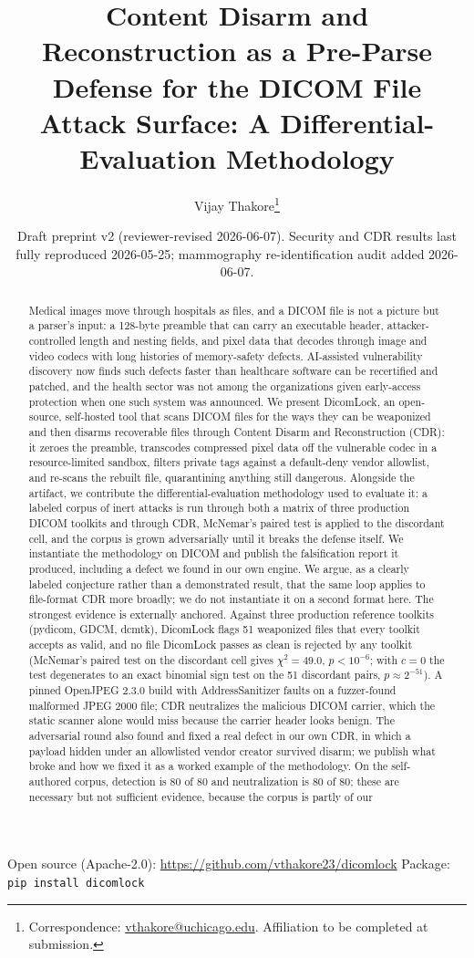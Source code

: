 \documentclass[11pt]{article}
\title{Content Disarm and Reconstruction as a Pre-Parse Defense for the DICOM File Attack Surface: A Differential-Evaluation Methodology}
\author{Vijay Thakore\thanks{Correspondence: \href{mailto:vthakore@uchicago.edu}{vthakore@uchicago.edu}. Affiliation to be completed at submission.}}
\date{Draft preprint v2 (reviewer-revised 2026-06-07). Security and CDR results last fully reproduced 2026-05-25; mammography re-identification audit added 2026-06-07.}
\begin{document}
\maketitle

\begin{center}
\small
Open source (Apache-2.0): \url{https://github.com/vthakore23/dicomlock} \quad Package: \texttt{pip install dicomlock}
\end{center}

\begin{abstract}
Medical images move through hospitals as files, and a DICOM file is not a picture but a parser's input: a 128-byte preamble that can carry an executable header, attacker-controlled length and nesting fields, and pixel data that decodes through image and video codecs with long histories of memory-safety defects. AI-assisted vulnerability discovery now finds such defects faster than healthcare software can be recertified and patched, and the health sector was not among the organizations given early-access protection when one such system was announced. We present DicomLock, an open-source, self-hosted tool that scans DICOM files for the ways they can be weaponized and then disarms recoverable files through Content Disarm and Reconstruction (CDR): it zeroes the preamble, transcodes compressed pixel data off the vulnerable codec in a resource-limited sandbox, filters private tags against a default-deny vendor allowlist, and re-scans the rebuilt file, quarantining anything still dangerous. Alongside the artifact, we contribute the differential-evaluation methodology used to evaluate it: a labeled corpus of inert attacks is run through both a matrix of three production DICOM toolkits and through CDR, McNemar's paired test is applied to the discordant cell, and the corpus is grown adversarially until it breaks the defense itself. We instantiate the methodology on DICOM and publish the falsification report it produced, including a defect we found in our own engine. We argue, as a clearly labeled conjecture rather than a demonstrated result, that the same loop applies to file-format CDR more broadly; we do not instantiate it on a second format here. The strongest evidence is externally anchored. Against three production reference toolkits (pydicom, GDCM, dcmtk), DicomLock flags 51 weaponized files that every toolkit accepts as valid, and no file DicomLock passes as clean is rejected by any toolkit (McNemar's paired test on the discordant cell gives $\chi^2 = 49.0$, $p < 10^{-6}$; with $c = 0$ the test degenerates to an exact binomial sign test on the 51 discordant pairs, $p \approx 2^{-51}$). A pinned OpenJPEG 2.3.0 build with AddressSanitizer faults on a fuzzer-found malformed JPEG 2000 file; CDR neutralizes the malicious DICOM carrier, which the static scanner alone would miss because the carrier header looks benign. The adversarial round also found and fixed a real defect in our own CDR, in which a payload hidden under an allowlisted vendor creator survived disarm; we publish what broke and how we fixed it as a worked example of the methodology. On the self-authored corpus, detection is 80 of 80 and neutralization is 80 of 80; these are necessary but not sufficient evidence, because the corpus is partly of our 
\end{abstract}
\end{document}
